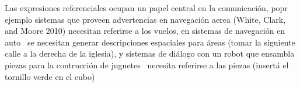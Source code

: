 Las expresiones referenciales ocupan un papel central en la comunicaci\'on, popr ejemplo sistemas que proveen advertencias en navegaci\'on aerea
 (White, Clark, and Moore 2010) necesitan referirse a los vuelos, en sistemas de navegaci\'on en auto~\cite{Drager:2012:GLN:2380816.2380908} se necesitan generar descripciones espaciales para \'areas (tomar la siguiente calle a la derecha de la iglesia), y sistemas de di\'alogo con un robot que ensambla piezas para la contrucci\'on de juguetes~\cite{foster-etal-ijcai2009} necesita referirse a las piezas (insert\'a el tornillo verde en el cubo)

